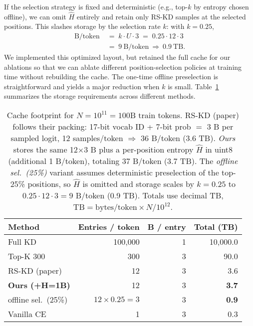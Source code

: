 \documentclass[11pt]{article}
\begin{document}
If the selection strategy is fixed and deterministic (e.g., top-$k$ by entropy chosen offline), we can omit $\hat H$ entirely and retain only RS-KD samples at the selected positions. This slashes storage by the selection rate $k$: with $k{=}0.25$,
\begin{align*}
	\text{B}/\text{token} \; & =\; k \cdot U \cdot 3
	\;=\; 0.25 \cdot 12 \cdot 3                                                               \\
	\;                       & =\; 9~\text{B}/\text{token} \ \Longrightarrow\ 0.9~\text{TB}.
\end{align*}
We implemented this optimized layout, but retained the full cache for our ablations so that we can ablate different position-selection policies at training time without rebuilding the cache. The one-time offline preselection is straightforward and yields a major reduction when $k$ is small.
Table~\ref{tab:storage} summarizes the storage requirements across different methods.


\begin{table}[h]
	\centering
	\begin{adjustbox}{max width=\linewidth}
		\begin{tabular}{lrrr}
			\toprule
			Method                    & Entries / token          & B / entry & Total (TB)   \\
			\midrule
			Full KD                   & 100{,}000                & 1         & 10{,}000.0   \\
			Top-K 300                 & 300                      & 3         & 90.0         \\
			RS-KD (paper)             & 12                       & 3         & 3.6          \\
			\textbf{Ours (+H=1B)}     & 12                       & 3         & \textbf{3.7} \\
			\quad offline sel.~(25\%) & $12 \!\times\! 0.25 = 3$ & 3         & \textbf{0.9} \\
			Vanilla CE                & 1                        & 3         & 0.3          \\
			\bottomrule
		\end{tabular}
	\end{adjustbox}
	\caption{Cache footprint for $N{=}10^{11}{=}100\text{B}$ train tokens. RS-KD (paper) follows their packing: 17-bit vocab ID + 7-bit prob $=$ 3 B per sampled logit, 12 samples/token $\Rightarrow$ 36 B/token (3.6 TB). \textit{Ours} stores the same 12$\times$3 B plus a per-position entropy $\hat H$ in uint8 (additional 1 B/token), totaling 37 B/token (3.7 TB). The \textit{offline sel.~(25\%)} variant assumes deterministic preselection of the top-25\% positions, so $\hat H$ is omitted and storage scales by $k{=}0.25$ to $0.25{\cdot}12{\cdot}3{=}9$ B/token (0.9 TB). Totals use decimal TB, $\mathrm{TB}=\text{bytes/token}\times N/10^{12}$.}
	\label{tab:storage}
\end{table}
\end{document}
